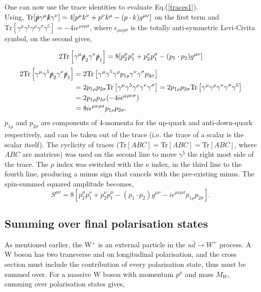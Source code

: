 \documentclass[a4paper,11pt]{article}
\begin{document}
One can now use the trace identities to evaluate Eq.(\ref{traces1}).\\
Using, $ \text{Tr}[\slashed{p}\gamma^\mu \slashed{k} \gamma^\nu] = 4[p^\mu k^\nu + p^\nu k^\mu - (p \cdot k) g^{\mu \nu}]$ on the first term and $\text{Tr}[\gamma^\mu \gamma^\nu \gamma^\rho \gamma^\sigma \gamma^5] = -4i\epsilon^{\mu \nu \rho \sigma}$, where $\epsilon_{\mu \nu \rho \sigma}$ is the totally anti-symmetric Levi-Civita symbol, on the second gives,

\begin{equation}\label{traces_first_term}
	\begin{aligned}
		2\text{Tr}\left[\gamma^\mu \slashed{p}_2\gamma^\nu \slashed{p}_1 \right] = 8[p_2^\mu p_1^\nu + p_2^\nu p_1^\mu - (p_1 \cdot p_2) g^{\mu \nu}]
	\end{aligned}
\end{equation}
\begin{equation}\label{traces_second_term}
	\begin{aligned}
	2\text{Tr}\left[ \gamma^\mu \gamma^5 \slashed{p}_2\gamma^\nu \slashed{p}_1 \right] &=   	2\text{Tr}\left[ \gamma^\mu \gamma^5  \gamma^\rho p_{1\rho} \gamma^\nu \gamma^\sigma p_{2\sigma} \right]\\ 
	&= 2p_{1\rho}p_{2\sigma}\text{Tr}\left[ \gamma^\mu \gamma^5 \gamma^\rho \gamma^\nu \gamma^\sigma \right]= 2p_{1\rho}p_{2\sigma}\text{Tr}\left[ \gamma^\mu \gamma^\rho \gamma^\nu \gamma^\sigma \gamma^5 \right] \\
	&=  2p_{1\rho}p_{2\sigma} (-4i \epsilon^{\mu \rho\nu\sigma})\\
	&= 8i \epsilon^{\mu \nu \rho \sigma}p_{1\rho}p_{2\sigma}.
	\end{aligned}
\end{equation}
$p_{1\rho}$ and $p_{2 \sigma}$ are components of 4-momenta for the up-quark and anti-down-quark respectively, and can be taken out of the trace (i.e. the trace of a scalar is the scalar itself). The cyclicity of traces (Tr$[ABC]=$Tr$[ABC]=$Tr$[ABC]$, where $ABC$ are matrices) was used on the second line to move $\gamma^5$ the right most side of the trace. The $\rho$ index was switched with the $\nu$ index, in the third line to the fourth line, producing a minus sign that cancels with the pre-existing minus. The spin-summed squared amplitude becomes, $$S^{\mu\nu}= 8[p_2^\mu p_1^\nu + p_2^\nu p_1^\mu - (p_1 \cdot p_2) g^{\mu \nu} -i \epsilon^{\mu \nu \rho \sigma}p_{1\rho}p_{2\sigma}].$$ 

\subsection{Summing over final polarisation states}\label{pol}
As mentioned earlier, the W$^{+}$ is an external particle in the $u\bar{d} \rightarrow W^+$ process. A W boson has two transverse and on longitudinal polarisation, and the cross section must include the contribution of every polarisation state, thus must be summed over. For a massive W boson with momentum $p^\mu$ and mass $M_W$, summing over polarisation states gives,
\end{document}

